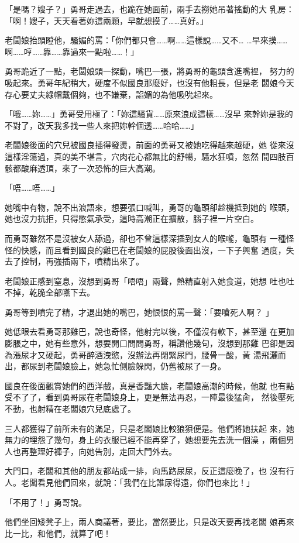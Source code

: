 「是嗎？嫂子？」勇哥走過去，也跪在她面前，兩手去撈她吊著搖動的大
乳房：「啊！嫂子，天天看著妳這兩顆，早就想摸了……真好。」

老闆娘抬頭瞪他，騷媚的罵：「你們都只會……啊……這樣說……又不…
…早來摸……啊……哼……靠……靠過來一點啦……！」

勇哥跪近了一點，老闆娘頭一探動，嘴巴一張，將勇哥的龜頭含進嘴裡，
努力的吸起來。勇哥年紀稍大，硬度不似國良那麼好，也沒有他粗長，但是老
闆娘今天存心要丈夫綠帽戴個夠，也不嫌棄，諂媚的為他吸吮起來。

「哦……妳……」勇哥受用極了：「妳這騷貨……原來浪成這樣……沒早
來幹妳是我的不對了，改天我多找一些人來把妳幹個透……哈哈……」

老闆娘後面的穴兒被國良插得發燙，前面的勇哥又被她吃得越來越硬，她
從來沒這樣淫蕩過，真的美不堪言，穴肉花心都無比的舒暢，騷水狂噴，忽然
間四肢百骸都酸麻透頂，來了一次恐怖的巨大高潮。

「唔……唔……」

她嘴中有物，說不出浪語來，想要張口喊叫，勇哥的龜頭卻趁機抵到她的
喉頭，她也沒力抗拒，只得憋氣承受，這時高潮正在擴散，腦子裡一片空白。

而勇哥雖然不是沒被女人舔過，卻也不曾這樣深插到女人的喉嚨，龜頭有
一種怪怪的快感，而且看到國良的雞巴在老闆娘的屁股後面出沒，一下子興奮
過度，失去了控制，再強插兩下，噴精出來了。

老闆娘正感到窒息，沒想到勇哥「唔唔」兩聲，熱精直射入她食道，她想
吐也吐不掉，乾脆全部嚥下去。

勇哥等到噴完了精，才退出她的嘴巴，她恨恨的罵一聲：「要嗆死人啊？
」

她低眼去看勇哥那雞巴，說也奇怪，他射完以後，不僅沒有軟下，甚至還
在更加膨脹之中，她有些意外，想要開口問問勇哥，稱讚他幾句，沒想到那雞
巴卻是因為漲尿才又硬起，勇哥醉酒洩慾，沒辦法再閉緊尿門，腰骨一酸，黃
湯飛灑而出，都尿到老闆娘臉上，她急忙側臉躲閃，仍舊被尿了一身。

國良在後面觀賞她們的西洋戲，真是香豔大膽，老闆娘高潮的時候，他就
也有點受不了了，看到勇哥尿在老闆娘身上，更是無法再忍，一陣最後猛肏，
然後壓死不動，也射精在老闆娘穴兒底處了。

三人都獲得了前所未有的滿足，只是老闆娘比較狼狽便是。他們將她扶起
來，她無力的埋怨了幾句，身上的衣服已經不能再穿了，她想要先去洗一個澡
，兩個男人也再整理好褲子，向她告別，走回大門外去。

大門口，老闆和其他的朋友都站成一排，向馬路尿尿，反正這麼晚了，也
沒有行人。老闆看見他們回來，就說：「我們在比誰尿得遠，你們也來比！」

「不用了！」勇哥說。

他們坐回矮凳子上，兩人商議著，要比，當然要比，只是改天要再找老闆
娘再來比一比，和他們，就算了吧！











